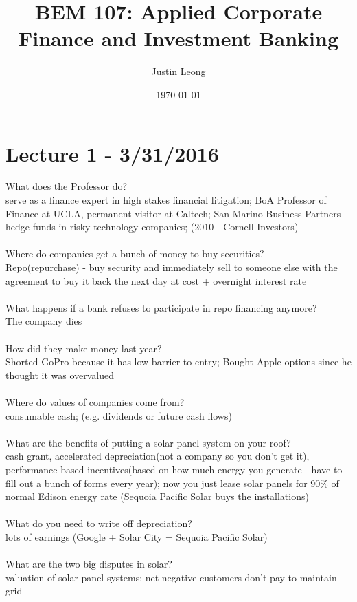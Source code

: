 \documentclass[11pt]{article}
\title{\textbf{BEM 107: Applied Corporate Finance and Investment Banking}}
\author{Justin Leong}
\date{\today}
\begin{document}
\maketitle

\section{Lecture 1 - 3/31/2016}
What does the Professor do?
\\serve as a finance expert in high stakes financial litigation; BoA Professor of Finance at UCLA, permanent visitor at Caltech; San Marino Business Partners - hedge funds in risky technology companies; (2010 - Cornell Investors)
\\\\Where do companies get a bunch of money to buy securities?
\\Repo(repurchase) - buy security and immediately sell to someone else with the agreement to buy it back the next day at cost + overnight interest rate
\\\\What happens if a bank refuses to participate in repo financing anymore?
\\The company dies
\\\\How did they make money last year?
\\Shorted GoPro because it has low barrier to entry; Bought Apple options since he thought it was overvalued
\\\\Where do values of companies come from?
\\consumable cash; (e.g. dividends or future cash flows)
\\\\What are the benefits of putting a solar panel system on your roof?
\\cash grant, accelerated depreciation(not a company so you don't get it), performance based incentives(based on how much energy you generate - have to fill out a bunch of forms every year); now you just lease solar panels for 90\% of normal Edison energy rate (Sequoia Pacific Solar buys the installations)
\\\\What do you need to write off depreciation?
\\lots of earnings (Google + Solar City = Sequoia Pacific Solar)
\\\\What are the two big disputes in solar?
\\valuation of solar panel systems; net negative customers don't pay to maintain grid
\end{document}
